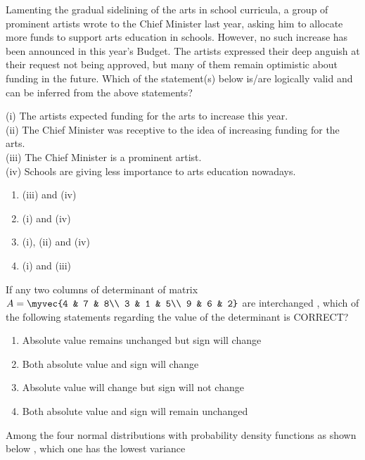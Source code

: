 \item Lamenting the gradual sidelining of the arts in school curricula, a group of prominent artists wrote to the Chief Minister last year, asking him to allocate more funds to support arts education in schools. However, no such increase has been announced in this year's Budget. The artists expressed their deep anguish at their request not being approved, but many of them remain optimistic about funding in the future.
Which of the statement(s) below is/are logically valid and can be inferred from the above statements?

(i) The artists expected funding for the arts to increase this year.\\
(ii) The Chief Minister was receptive to the idea of increasing funding for the arts.\\
(iii) The Chief Minister is a prominent artist.\\
(iv) Schools are giving less importance to arts education nowadays.
 \hfill{}

			\begin{enumerate}
\item  (iii) and (iv)
\item (i) and (iv)
\item (i), (ii) and (iv)
\item (i) and (iii)
   \end{enumerate}

  \item If any two columns of determinant  of matrix $A =\myvec{4 & 7 & 8\\ 3 & 1 & 5\\ 9 & 6 & 2}$ are interchanged , which of the following statements regarding the value of the determinant is CORRECT?
   \hfill{}
\begin{enumerate}
    \item Absolute value remains unchanged but sign will change
    \item Both absolute value and sign will change
    \item Absolute value will change but sign will not change
    \item Both absolute value and sign will remain unchanged
\end{enumerate}

  \item Among the four normal distributions with probability density functions as shown below , which one has the lowest variance
  
   \hfill{}
  
